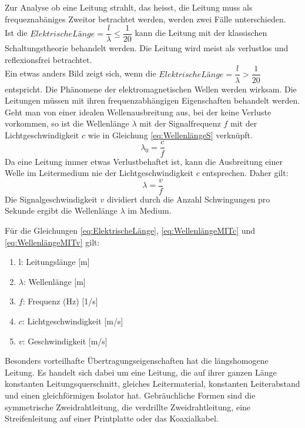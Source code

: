Zur Analyse ob eine Leitung strahlt, das heisst, die Leitung muss als frequeznabäniges Zweitor betrachtet werden, werden zwei Fälle unterschieden.\\
Ist die $Elektrische Länge=\dfrac{l}{\lambda} \le \dfrac{1}{20}$  kann die Leitung mit der klassischen Schaltungstheorie behandelt werden. Die Leitung wird meist als verlustlos und reflexionsfrei betrachtet.\\
Ein etwas anders Bild zeigt sich, wenn die $Elektrische Länge=\dfrac{l}{\lambda}>\dfrac{1}{20}$ entspricht. Die Phänomene der elektromagnetischen Wellen werden wirksam. Die Leitungen müssen mit ihren frequenzabhängigen Eigenschaften behandelt werden. 
Geht man von einer idealen Wellenausbreitung aus, bei der keine Verluste vorkommen, so ist die Wellenlänge $\lambda$ mit der Signalfrequenz $f$ mit der Lichtgeschwindigkeit $c$ wie in Gleichung \ref{eq:WellenlängeS} verknüpft.
\begin{equation}
\lambda_{0}=\dfrac{c}{f}\label{eq:WellenlängeMITc}
\end{equation}
Da eine Leitung immer etwas Verlustbehaftet ist, kann die Ausbreitung einer Welle im Leitermedium nie der Lichtgeschwindigkeit $c$ entsprechen. Daher gilt:
\begin{equation}
\lambda=\dfrac{v}{f}\label{eq:WellenlängeMITv}
\end{equation}
Die Signalgeschwindigkeit $v$ dividiert durch die Anzahl Schwingungen pro Sekunde ergibt die Wellenlänge $\lambda$ im Medium.

Für die Gleichungen \ref{eq:ElektrischeLänge}, \ref{eq:WellenlängeMITc} und \ref{eq:WellenlängeMITv} gilt:
\begin{enumerate}[leftmargin=2cm]
   \item[] l: Leitungslänge [m] 
   \item[] $\lambda$: Wellenlänge  [m] 
   \item[] $f$: Frequenz (Hz) [1/s] 
   \item[] $c$: Lichtgeschwindigkeit  [m/s] 
   \item[] $v$: Geschwindigkeit  [m/s] 
\end{enumerate} 
Besonders vorteilhafte Übertragungseigenschaften hat die längshomogene Leitung. Es handelt sich dabei um eine Leitung, die auf ihrer ganzen Länge konstanten Leitungsquerschnitt, gleiches
Leitermaterial, konstanten Leiterabstand und einen gleichförmigen Isolator hat. Gebräuchliche Formen sind die symmetrische Zweidrahtleitung, die verdrillte Zweidrahtleitung, eine Streifenleitung auf
einer Printplatte oder das Koaxialkabel.

